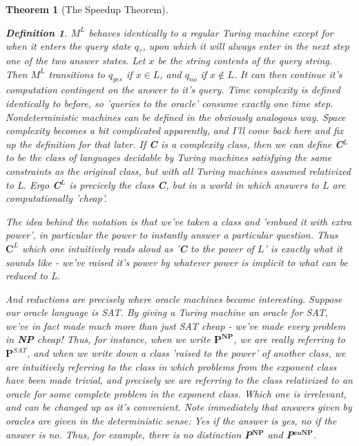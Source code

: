 \documentclass{article}
\theoremstyle{definition}
\newtheorem{definition}{Definition}[section]
\theoremstyle{plain}
\theoremstyle{theorem}
\newtheorem{theorem}{Theorem}[section]
\begin{document}
\begin{theorem}[The Speedup Theorem]
\begin{definition}
    \par $M^L$ behaves identically to a regular Turing machine except for when it enters the query state $q_?$, upon which it will always enter in the next step one of the two answer states. Let $x$ be the string contents of the query string. Then $M^L$ transitions to $q_{yes}$ if $x \in L$, and $q_{no}$ if $x \notin L$. It can then continue it's computation contingent on the answer to it's query. Time complexity is defined identically to before, so 'queries to the oracle' consume exactly one time step. Nondeterministic machines can be defined in the obviously analogous way. Space complexity becomes a bit complicated apparently, and I'll come back here and fix up the definition for that later. If \textbf{C} is a complexity class, then we can define \textbf{C}$^L$ to be the class of languages decidable by Turing machines satisfying the same constraints as the original class, but with all Turing machines assumed relativized to L. Ergo \textbf{C}$^L$ is precicely the class \textbf{C}, but in a world in which answers to $L$ are computationally 'cheap'.
\end{definition}
The idea behind the notation is that we've taken a class and 'embued it with extra power', in particular the power to instantly answer a particular question. Thus $\textbf{C}^L$ which one intuitively reads aloud as '\textbf{C} to the power of $L$' is exactly what it sounds like - we've raised it's power by whatever power is implicit to what can be reduced to L.
\par And reductions are precisely where oracle machines become interesting. Suppose our oracle language is SAT. By giving a Turing machine an oracle for SAT, we've in fact made much more than just SAT cheap - we've made every problem in \textbf{NP} cheap! Thus, for instance, when we write $\textbf{P}^{\textbf{NP}}$, we are really referring to $\textbf{P}^{SAT}$, and when we write down a class 'raised to the power' of another class, we are intuitively referring to the class in which problems from the exponent class have been made trivial, and precisely we are referring to the class relativized to an oracle for some complete problem in the exponent class. Which one is irrelevant, and can be changed up as it's convenient.
Note immediately that answers given by oracles are given in the \textit{deterministic} sense: Yes if the answer is yes, no if the answer is no. Thus, for example, there is no distinction \textbf{P}$^{\textbf{NP}}$ and \textbf{P}$^{\textbf{coNP}}$.



\end{theorem}
\end{document}
